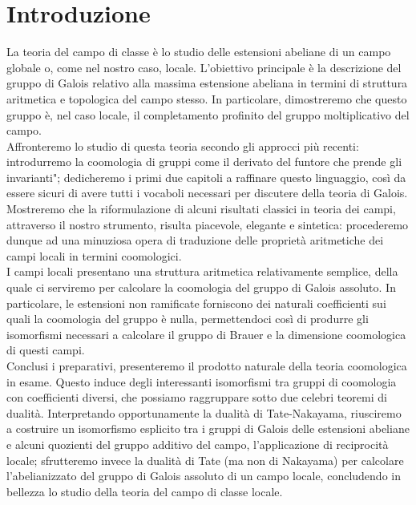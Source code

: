 \chapter*{Introduzione}

La teoria del campo di classe è lo studio delle estensioni abeliane di un campo globale o, come nel nostro caso, locale. L'obiettivo principale è la descrizione del gruppo di Galois relativo alla massima estensione abeliana in termini di struttura aritmetica e topologica del campo stesso. In particolare, dimostreremo che questo gruppo è, nel caso locale, il completamento profinito del gruppo moltiplicativo del campo. \\

Affronteremo lo studio di questa teoria secondo gli approcci più recenti: introdurremo la coomologia di gruppi come il derivato del funtore che \leftquote prende gli invarianti"; dedicheremo i primi due capitoli a raffinare questo linguaggio, così da essere sicuri di avere tutti i vocaboli necessari per discutere della teoria di Galois. Mostreremo che la riformulazione di alcuni risultati classici in teoria dei campi, attraverso il nostro strumento, risulta piacevole, elegante e sintetica: procederemo dunque ad una minuziosa opera di traduzione delle proprietà aritmetiche dei campi locali in termini coomologici. \\

I campi locali presentano una struttura aritmetica relativamente semplice, della quale ci serviremo per calcolare la coomologia del gruppo di Galois assoluto. In particolare, le estensioni non ramificate forniscono dei naturali coefficienti sui quali la coomologia del gruppo è nulla, permettendoci così di produrre gli isomorfismi necessari a calcolare il gruppo di Brauer e la dimensione coomologica di questi campi. \\

Conclusi i preparativi, presenteremo il prodotto naturale della teoria coomologica in esame. Questo induce degli interessanti isomorfismi tra gruppi di coomologia con coefficienti diversi, che possiamo raggruppare sotto due celebri teoremi di dualità. Interpretando opportunamente la dualità di Tate-Nakayama, riusciremo a costruire un isomorfismo esplicito tra i gruppi di Galois delle estensioni abeliane e alcuni quozienti del gruppo additivo del campo, l'applicazione di reciprocità locale; sfrutteremo invece la dualità di Tate (ma non di Nakayama) per calcolare l'abelianizzato del gruppo di Galois assoluto di un campo locale, concludendo in bellezza lo studio della teoria del campo di classe locale. \\



\vfill\break

